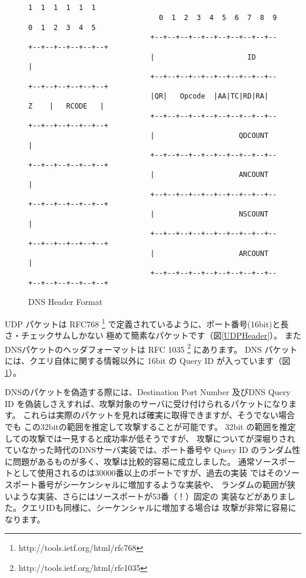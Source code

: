 \begin{figure}[hbt]
{\scriptsize
\begin{verbatim}

                                                             1  1  1  1  1  1
                               0  1  2  3  4  5  6  7  8  9  0  1  2  3  4  5
                             +--+--+--+--+--+--+--+--+--+--+--+--+--+--+--+--+
                             |                      ID                       |
                             +--+--+--+--+--+--+--+--+--+--+--+--+--+--+--+--+
                             |QR|   Opcode  |AA|TC|RD|RA|   Z    |   RCODE   |
                             +--+--+--+--+--+--+--+--+--+--+--+--+--+--+--+--+
                             |                    QDCOUNT                    |
                             +--+--+--+--+--+--+--+--+--+--+--+--+--+--+--+--+
                             |                    ANCOUNT                    |
                             +--+--+--+--+--+--+--+--+--+--+--+--+--+--+--+--+
                             |                    NSCOUNT                    |
                             +--+--+--+--+--+--+--+--+--+--+--+--+--+--+--+--+
                             |                    ARCOUNT                    |
                             +--+--+--+--+--+--+--+--+--+--+--+--+--+--+--+--+
\end{verbatim}
}
\caption{DNS Header Format}
\label{DNSHeader}
\end{figure}


UDP パケットは RFC768 \footnote{http://tools.ietf.org/html/rfc768}
で定義されているように、ポート番号(16bit)と長さ・チェックサムしかない
極めて簡素なパケットです（図\ref{UDPHeader}）。
またDNSパケットのヘッダフォーマットは RFC 1035 \footnote{http://tools.ietf.org/html/rfc1035} 
にあります。
DNS パケットには、クエリ自体に関する情報以外に 16bit の Query ID が入っています（図\ref{DNSHeader}）。

DNSのパケットを偽造する際には、Destination Port Number 及びDNS Query
ID を偽装しさえすれば、攻撃対象のサーバに受け付けられるパケットになります。
これらは実際のパケットを見れば確実に取得できますが、そうでない場合でも
この32bitの範囲を推定して攻撃することが可能です。
32bit の範囲を推定しての攻撃では一見すると成功率が低そうですが、
攻撃についてが深堀りされていなかった時代のDNSサーバ実装では、ポート番号や
Query ID のランダム性に問題があるものが多く、攻撃は比較的容易に成立しました。
通常ソースポートとして使用されるのは30000番以上のポートですが、過去の実装
ではそのソースポート番号がシーケンシャルに増加するような実装や、
ランダムの範囲が狭いような実装、さらにはソースポートが53番（！）固定の
実装などがありました。クエリIDも同様に、シーケンシャルに増加する場合は
攻撃が非常に容易になります。

